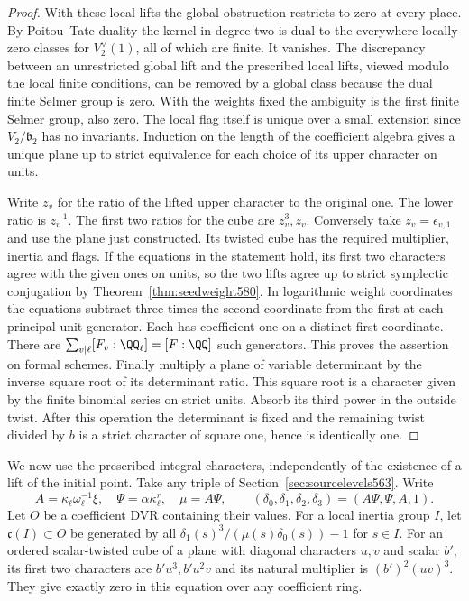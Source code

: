 \documentclass[a4paper,11pt]{article}
\theoremstyle{definition}
\theoremstyle{remark}
\numberwithin{equation}{section}
\begin{document}
\begin{proof}
With these local lifts the global obstruction restricts to
zero at every place. By Poitou--Tate duality the kernel in degree two is dual
to the everywhere locally zero classes for \(V_2^\vee(1)\),
all of which are finite. It vanishes. The discrepancy between
an unrestricted global lift and the prescribed local lifts,
viewed modulo the local finite conditions, can be removed
by a global class because the dual finite Selmer group is
zero. With the weights fixed the ambiguity is the first
finite Selmer group, also zero. The local flag itself is unique
over a small extension since \(V_2/\mathfrak b_2\) has no
invariants. Induction on the length of the coefficient algebra
gives a unique plane up to strict equivalence for each choice
of its upper character on units.

Write \(z_v\) for the ratio of the lifted upper character to
the original one. The lower ratio is \(z_v^{-1}\). The first
two ratios for the cube are \(z_v^3,z_v\). Conversely take
\(z_v=\epsilon_{v,1}\) and use the plane just constructed.
Its twisted cube has the required multiplier, inertia and flags.
If the equations in the statement hold, its first two characters
agree with the given ones on units, so the two lifts agree
up to strict symplectic conjugation by
Theorem~\ref{thm:seedweight580}. In logarithmic weight
coordinates the equations subtract three times the second
coordinate from the first at each principal-unit generator.
Each has coefficient one on a distinct first coordinate.
There are \(\sum_{v\mid\ell}[F_v:\QQ_\ell]=[F:\QQ]\) such
generators. This proves the assertion on formal schemes.
Finally multiply a plane of variable determinant by the
inverse square root of its determinant ratio. This square
root is a character given by the finite binomial series on
strict units. Absorb its third power in the outside twist.
After this operation the determinant is fixed and the
remaining twist divided by \(b\) is a strict character of
square one, hence is identically one.
\end{proof}

We now use the prescribed integral characters, independently
of the existence of a lift of the initial point. Take any
triple of Section~\ref{sec:sourcelevels563}. Write
\[
  A=\kappa_\ell\omega_\ell^{-1}\xi,\quad
  \Psi=\alpha\kappa_\ell^r,\quad \mu=A\Psi,\qquad
  (\delta_0,\delta_1,\delta_2,\delta_3)=(A\Psi,\Psi,A,1).
\]
Let \(O\) be a coefficient DVR containing their values. For a
local inertia group \(I\), let \(\mathfrak c(I)\subset O\)
be generated by all
\(\delta_1(s)^3/(\mu(s)\delta_0(s))-1\) for \(s\in I\).
For an ordered scalar-twisted cube of a plane with diagonal
characters \(u,v\) and scalar \(b'\), its first two characters
are \(b'u^3,b'u^2v\) and its natural multiplier is
\((b')^2(uv)^3\). They give exactly zero in this equation
over any coefficient ring.
\end{document}
